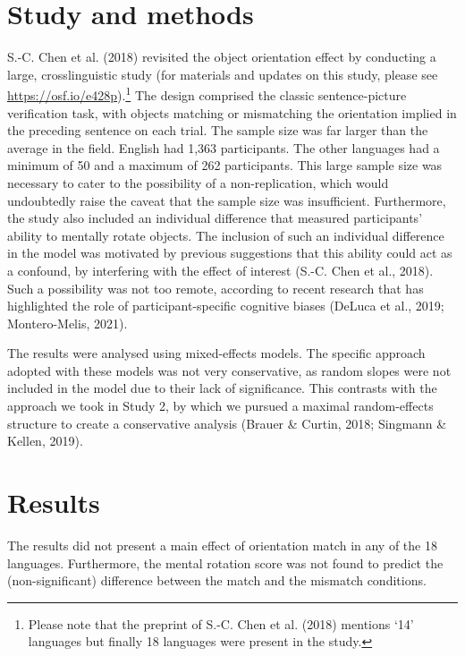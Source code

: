 \documentclass[
  12pt,
  man,floatsintext]{apa7}
\begin{document}
\hypertarget{study-and-methods}{%
\section{Study and methods}\label{study-and-methods}}

S.-C. Chen et al. (2018) revisited the object orientation effect by conducting a large, crosslinguistic study (for materials and updates on this study, please see \url{https://osf.io/e428p}).\footnote{Please note that the preprint of S.-C. Chen et al. (2018) mentions `14' languages but finally 18 languages were present in the study.} The design comprised the classic sentence-picture verification task, with objects matching or mismatching the orientation implied in the preceding sentence on each trial. The sample size was far larger than the average in the field. English had 1,363 participants. The other languages had a minimum of 50 and a maximum of 262 participants. This large sample size was necessary to cater to the possibility of a non-replication, which would undoubtedly raise the caveat that the sample size was insufficient. Furthermore, the study also included an individual difference that measured participants' ability to mentally rotate objects. The inclusion of such an individual difference in the model was motivated by previous suggestions that this ability could act as a confound, by interfering with the effect of interest (S.-C. Chen et al., 2018). Such a possibility was not too remote, according to recent research that has highlighted the role of participant-specific cognitive biases (DeLuca et al., 2019; Montero-Melis, 2021).

The results were analysed using mixed-effects models. The specific approach adopted with these models was not very conservative, as random slopes were not included in the model due to their lack of significance. This contrasts with the approach we took in Study 2, by which we pursued a maximal random-effects structure to create a conservative analysis (Brauer \& Curtin, 2018; Singmann \& Kellen, 2019).

\hypertarget{results}{%
\section{Results}\label{results}}

The results did not present a main effect of orientation match in any of the 18 languages. Furthermore, the mental rotation score was not found to predict the (non-significant) difference between the match and the mismatch conditions.
\end{document}
